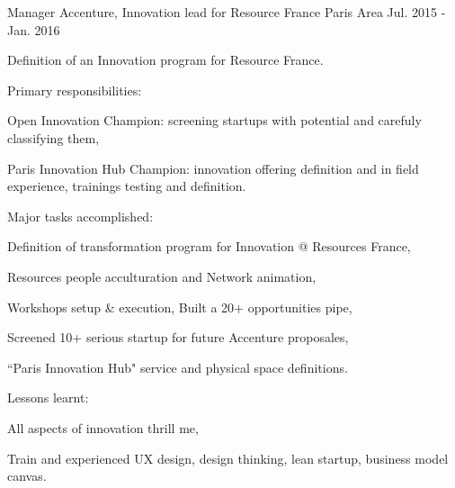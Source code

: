 \begin{cventries}
  \cventry
    {Manager} %
    {Accenture, Innovation lead for Resource France} %
    {Paris Area} %
    {Jul. 2015 - Jan. 2016} %
    {
      \begin{cvitems} %
        \item {Definition of an Innovation program for Resource France.}
        \item {Primary responsibilities:}
        \begin{cvsubitems}
          \item {Open Innovation Champion: screening startups with potential and carefuly classifying them,}
          \item {Paris Innovation Hub Champion: innovation offering definition and in field experience, trainings testing and definition.}
        \end{cvsubitems}
        \item {Major tasks accomplished:}
        \begin{cvsubitems}
          \item {Definition of transformation program for Innovation @ Resources France,}
          \item {Resources people acculturation and Network animation,}
          \item {Workshops setup \& execution, Built a 20+ opportunities pipe,}
          \item {Screened 10+ serious startup for future Accenture proposales,}
          \item {``Paris Innovation Hub" service and physical space definitions.}
        \end{cvsubitems}
        \item {Lessons learnt:}
        \begin{cvsubitems}
          \item {All aspects of innovation thrill me,}
          \item {Train and experienced UX design, design thinking, lean startup, business model canvas.}
        \end{cvsubitems}
      \end{cvitems}
    }


\end{cventries}
